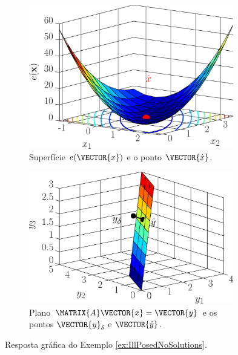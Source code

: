 \begin{figure}[h!]
     \centering
     \begin{subfigure}[b]{0.475\textwidth}
         \centering
         \includegraphics[width=0.98\textwidth]{chapters/notacao/mfiles/illpossed1/surfcex.eps}
         \caption{Superfície $e(\VECTOR{x})$ e o ponto $\VECTOR{\hat{x}}$. }
         \label{fig:ex:IllPosedNoSolutions:a}
     \end{subfigure}
     \hfill
     \begin{subfigure}[b]{0.475\textwidth}
         \centering
         \includegraphics[width=0.98\textwidth]{chapters/notacao/mfiles/illpossed1/surfcax.eps}
         \caption{Plano $\MATRIX{A}\VECTOR{x}=\VECTOR{y}$ e os pontos $\VECTOR{y}_{\delta}$ e $\VECTOR{\hat{y}}$.}
         \label{fig:ex:IllPosedNoSolutions:b}
     \end{subfigure}
        \caption{Resposta gráfica do Exemplo \ref{ex:IllPosedNoSolutions}. }
        \label{fig:ex:IllPosedNoSolutions}
\end{figure}

